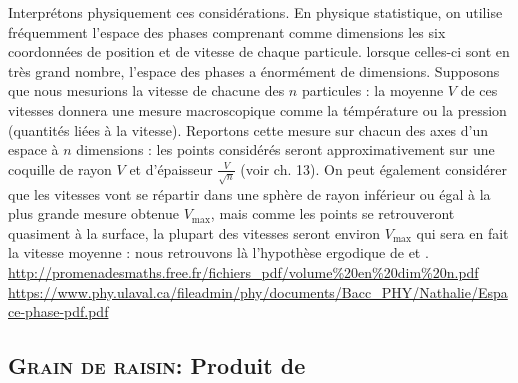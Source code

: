 
\begin{remarque}
Interprétons physiquement ces considérations. En physique statistique, on utilise fréquemment l'espace des phases comprenant comme dimensions les six coordonnées de position et de vitesse de chaque particule. lorsque celles-ci sont en très grand nombre, l'espace des phases a énormément de dimensions. Supposons que nous mesurions la vitesse de chacune des $n$ particules : la moyenne $V$ de ces vitesses donnera une mesure macroscopique comme la témpérature ou la pression (quantités liées à la vitesse). Reportons cette mesure sur chacun des axes d'un espace à $n$ dimensions : les points considérés seront approximativement sur une coquille de rayon $V$ et d'épaisseur $\frac{V}{\sqrt{n}}$ (voir ch. 13). On peut également considérer que les vitesses vont se répartir dans une sphère de rayon inférieur ou égal à la plus grande mesure obtenue $V_\mathrm{max}$, mais comme les points se retrouveront quasiment à la surface, la plupart des vitesses seront environ $V_\mathrm{max}$ qui sera en fait la vitesse moyenne : nous retrouvons là l'hypothèse ergodique de  et . \url{http://promenadesmaths.free.fr/fichiers_pdf/volume%20en%20dim%20n.pdf} \url{https://www.phy.ulaval.ca/fileadmin/phy/documents/Bacc_PHY/Nathalie/Espace-phase-pdf.pdf}
\end{remarque}




\subsection{\textsc{Grain de raisin}: Produit de }


